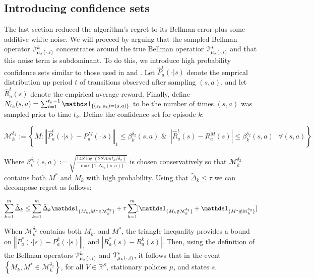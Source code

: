 \subsection{Introducing confidence sets}
The last section reduced the algorithm's regret to its Bellman error plus some additive white noise. We will proceed by arguing that the sampled Bellman operator $\mathcal{T}_{\mu_{k}(\cdot,i)}^{k}$ concentrates around the true Bellman operatior $\mathcal{T}_{\mu_{k}(\cdot,i)}^{*}$ and that this noise term is subdominant. To do this, we introduce high probability confidence sets similar to those used in \cite{jaksch2010near} and \cite{bartlett2009regal}. Let $\hat{P}_a^{t}(\cdot | s)$ denote the emprical distribution up period $t$ of transitions observed after sampling $(s,a)$, and let $\hat{R}_{a}^{t}(s)$ denote the empirical average reward. Finally, define $N_{t_k}(s,a)= \sum_{t=1}^{t_k-1}\Ind_{\{(s_t,a_t)=(s,a)\}}$ to be the number of times $(s,a)$ was sampled prior to time $t_k$. Define the confidence set for episode $k$:

$$\mathcal{M}_{k}^{\delta_{2}} := \left\{M: \left\Vert \hat{P}_{a}^{t}(\cdot | s) - P_a^{M}(\cdot | s)\right\Vert_1 \leq \beta_k^{\delta_2}(s,a) \,\, 
\& \,\,\, |\hat{R}_{a}^{t}(s) - R_a^{M}(s)|\leq \beta_k^{\delta_2}(s,a)
\,\,\,\, \forall (s,a) \right\}$$ 

Where $\beta_k^{\delta_2}(s,a) := \sqrt{\frac{14 S \log(2SAm t_k / \delta_{2})}{\max \{1,N_{t_k}(s,a) \}} }$ is chosen conservatively so that $\mathcal{M}_{k}^{\delta_{2}}$ contains both $M^*$ and $M_k$ with high probability.
Using that $\tilde{\Delta}_k\leq \tau$ %
we can decompose regret as follows:

\begin{equation}\label{eq: confidence set decomposition}
\sum_{k=1}^{m} \tilde{\Delta}_k \leq \sum_{k=1}^{m} \tilde{\Delta}_k \Ind_{\{M_k, M^* \in \mathcal{M}_k^{\delta_2}\}} +\tau \sum_{k=1}^{m} 
[\Ind_{\{M_k \notin \mathcal{M}_k^{\delta_2}\}}+\Ind_{\{M^* \notin \mathcal{M}_k^{\delta_2}\}}]
\end{equation}

When $\mathcal{M}_k^{\delta_{2}}$ contains both $M_k$, and $M^{*}$, the triangle inequality provides a bound on $\left\Vert P_{a}^{*}(\cdot | s)-P_{a}^{k}(\cdot |s)\right\Vert_1$ and $|R_{a}^{*}(s)-R_{a}^{k}(s)|$. 
Then, using the definition of the Bellman operators $\mathcal{T}_{\mu_{k}(\cdot,i)}^{k}$ and $\mathcal{T}_{\mu_{k}(\cdot,i)}^{*}$, 
it follows that in the event $\left\{M_k,M^{*}\in \mathcal{M}_k^{\delta_{2}}\right\}$, for all $V \in \mathbb{R}^{S}$, stationary policies $\mu$, and states $s$. 

